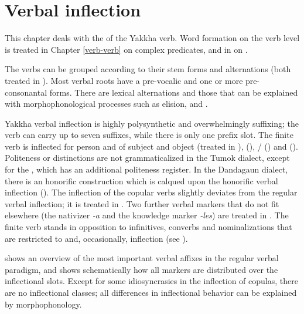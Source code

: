 \chapter{Verbal inflection}\label{verbalmorph}

This chapter deals with the  of the Yakkha verb. Word formation on the verb level is treated in  Chapter \ref{verb-verb} on complex predicates, and in  on .

The verbs can be grouped according to their stem forms and alternations (both  treated in ). Most verbal roots have a pre-vocalic and one or more pre-con\-so\-nan\-tal  forms. There are lexical alternations and those that can be explained with morphophonological processes such as elision,  and . 

Yakkha verbal inflection is highly polysynthetic and overwhelmingly suffixing; the verb can carry up to seven suffixes, while there is only one prefix slot. The finite verb is  inflected for person and  of subject and object (treated in ),  (),  / () and   (). Politeness or  distinctions are not grammaticalized in the Tumok dialect, except for the , which has an additional politeness register. In the Dandagaun dialect,  there is an honorific construction which is calqued upon the  honorific verbal inflection  (). The inflection of the copular verbs slightly deviates from the regular verbal inflection; it is treated in . Two further verbal markers that do not fit elsewhere (the nativizer \emph{-a} and the knowledge marker \emph{-les})  are treated in . The finite verb stands in opposition to infinitives, converbs and nominalizations that are restricted to  and, occasionally,  inflection (see ). 



 shows an overview of the most important verbal affixes in the regular verbal paradigm, and  shows schematically how all  markers are distributed over the inflectional slots. Except for some idiosyncrasies in the inflection of copulas, there are no inflectional classes; all differences in inflectional behavior can be explained by morphophonology. 


